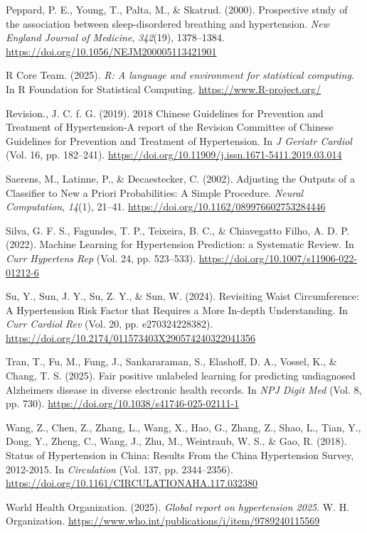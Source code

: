 \documentclass[10pt]{article}
\begin{document}
Peppard, P. E., Young, T., Palta, M., \& Skatrud. (2000). Prospective
study of the association between sleep-disordered breathing and
hypertension. \emph{New England Journal of Medicine}, \emph{342}(19),
1378--1384. \url{https://doi.org/10.1056/NEJM200005113421901}

R Core Team. (2025). \emph{R: A language and environment for statistical
computing}. In R Foundation for Statistical Computing.
\url{https://www.R-project.org/}

Revision., J. C. f. G. (2019). 2018 Chinese Guidelines for Prevention
and Treatment of Hypertension-A report of the Revision Committee of
Chinese Guidelines for Prevention and Treatment of Hypertension. In
\emph{J Geriatr Cardiol} (Vol. 16, pp. 182--241).
\url{https://doi.org/10.11909/j.issn.1671-5411.2019.03.014}

Saerens, M., Latinne, P., \& Decaestecker, C. (2002). Adjusting the
Outputs of a Classifier to New a Priori Probabilities: A Simple
Procedure. \emph{Neural Computation}, \emph{14}(1), 21--41.
\url{https://doi.org/10.1162/089976602753284446}

Silva, G. F. S., Fagundes, T. P., Teixeira, B. C., \& Chiavegatto Filho,
A. D. P. (2022). Machine Learning for Hypertension Prediction: a
Systematic Review. In \emph{Curr Hypertens Rep} (Vol. 24, pp. 523--533).
\url{https://doi.org/10.1007/s11906-022-01212-6}

Su, Y., Sun, J. Y., Su, Z. Y., \& Sun, W. (2024). Revisiting Waist
Circumference: A Hypertension Risk Factor that Requires a More In-depth
Understanding. In \emph{Curr Cardiol Rev} (Vol. 20, pp. e270324228382).
\url{https://doi.org/10.2174/011573403X290574240322041356}

Tran, T., Fu, M., Fung, J., Sankararaman, S., Elashoff, D. A., Vossel,
K., \& Chang, T. S. (2025). Fair positive unlabeled learning for
predicting undiagnosed Alzheimer\textquotesingle s disease in diverse
electronic health records. In \emph{NPJ Digit Med} (Vol. 8, pp. 730).
\url{https://doi.org/10.1038/s41746-025-02111-1}

Wang, Z., Chen, Z., Zhang, L., Wang, X., Hao, G., Zhang, Z., Shao, L.,
Tian, Y., Dong, Y., Zheng, C., Wang, J., Zhu, M., Weintraub, W. S., \&
Gao, R. (2018). Status of Hypertension in China: Results From the China
Hypertension Survey, 2012-2015. In \emph{Circulation} (Vol. 137, pp.
2344--2356). \url{https://doi.org/10.1161/CIRCULATIONAHA.117.032380}

World Health Organization. (2025). \emph{Global report on hypertension
2025}. W. H. Organization.
\url{https://www.who.int/publications/i/item/9789240115569}
\end{document}
